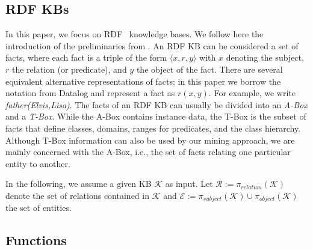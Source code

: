 
\subsection{RDF KBs}
In this paper, we focus on RDF~\cite{rdf} knowledge bases. We follow here the introduction of the preliminaries from \cite{amie}.
An RDF KB can be considered a set of facts, where each fact is a triple of the form $\langle x, r, y\rangle$ with $x$ denoting the subject, $r$ the relation (or predicate), and $y$ the object of the fact. %
There are several equivalent alternative representations of facts; in this paper we borrow the notation from Datalog and represent a fact as $r(x,y)$. For example, we write \emph{father(Elvis,Lisa)}.
The facts of an RDF KB can usually be divided into an \emph{A-Box} and a \emph{T-Box}. While the A-Box contains instance data, the T-Box is the subset of facts that define classes, domains, ranges for predicates, and the class hierarchy. Although T-Box information can also be used by our mining approach, we are mainly concerned with the A-Box, i.e., the set of facts relating one particular entity to another.

In the following, we assume a given KB $\mathcal{K}$ as input. Let $\mathcal{R}:=\pi_{relation}(\mathcal{K})$ 
denote the set of relations contained in $\mathcal{K}$ and $\mathcal{E}:=\pi_{subject}(\mathcal{K}) \cup \pi_{object}(\mathcal{K})$ the set of entities.


\subsection{Functions}
\label{subsec:functions}

